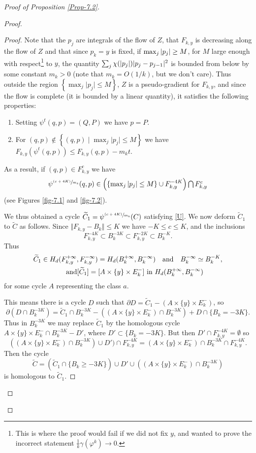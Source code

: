 \documentclass[JEP,XML,SOM,NoFloatCountersInSection,Unicode,published]{cedram}
\newcommand{\psfrac}[2]{\sfrac{(#1)}{#2}}
\newcommand{\quand}{\quad\text{and}\quad}
\numberwithin{equation}{section}
\let \a a
\let \A A
\theoremstyle{plain}
\theoremstyle{definition}
\theoremstyle{remark}
\begin{document}
\begin{proof}[Proof of Proposition \ref{Prop-7.2}]
\begin{proof}
\begin{proof}
Note that the $p_j$ are integrals of the flow of $Z$, that $F_{k,y}$ is decreasing along the flow of $Z$ and that since $p_k=y$ is fixed, if $\max_j \vert p_j \vert \geq\nobreak  M$, for $M$ large enough with respect\footnote{This is where the proof would fail if we did not fix $y$, and wanted to prove the incorrect statement $\frac{1}{k}\gamma(\varphi^k) \to 0$.} to $y$, the quantity $\sum_j \chi(\vert p_j \vert) \vert p_j-\nobreak p_{j-1} \vert^2$ is bounded from below by some constant $m_k>0$ (note that $m_k=O(1/k)$, but we don't care). Thus outside the region $\left\{ \max_j \vert p_j \vert \leq M \right\}$, $Z$ is a pseudo-gradient for $F_{k,y}$, and since the flow is complete (it is bounded by a linear quantity), it satisfies the following properties:
\begin{enumerate}
\item Setting $\psi^t(q,p)=(Q,P)$ we have $p=P$.
\item For $(q,p) \notin \left\{ (q,p) \mid \max_j \vert p_j \vert \leq M \right\}$ we have $F_{k,y}(\psi^t(q,p))\leq F_{k,y}(q,p)-m_kt$.
\end{enumerate}
As a result, if $(q,p)\in F_{k,y}^c$ we have
\[\textstyle
\psi^{ \psfrac{c+4K}{m_k} }(q,p)\in \left (\left\{ \max_j \vert p_j \vert \leq M \right\} \cup F_{k,y}^{-4K}\right) \bigcap F_{k,y}^c
\]
(see Figures \ref{fig-7.1} and \ref{fig-7.2}).

We thus obtained a cycle $\widetilde C_1=\psi^{ \psfrac{c+4K}{m_k} }(C)$ satisfying \eqref{U}. We now deform $\widetilde C_1$ to $\widetilde C$ as follows.
Since $\Vert F_{k,y}-B_k \Vert \leq K$ we have $-K\leq c \leq K$, and the inclusions
\[
F_{k,y}^{-4K}\subset B_k^{-3K}\subset F_{k,y}^{-2K}\subset B_k^{-K}.
\]
Thus
\begin{gather*}
\widetilde C_1 \in H_d(F_{k,y}^{+\infty},F_{k,y}^{-\infty})
= H_d(B_k^{+\infty},B_k^{-\infty})\quand B_k^{-\infty}\simeq B_k^{-K},\\
\tag*{and} [\widetilde C_1] =[\A \times\nobreak \{y\}\times\nobreak E_k^- ]\text{ in }H_d(B_k^{+\infty},B_k^{-\infty})
\end{gather*}
for some cycle $\A$ representing the class $\a$.

This means there is a cycle $D$ such that $\partial D= \widetilde C_1 - (\A \times \{y\}\times E_k^-)$, so
\[
\partial (D\cap B_k^{-3K})= \widetilde C_1 \cap B_k^{-3K} - \left ((\A \times \{y\}\times E_k^-)\cap B_k^{-3K}\right) + D\cap \{B_k=-3K\}.
\]
Thus in $B_k^{-3K}$ we may replace $\widetilde C_1$ by the homologous cycle $\A\times \{y\}\times E_k^-\cap B_k^{-3K} - D'$, where $D'\subset \{B_k=-3K\}$.
But then $D'\cap F_{k,y}^{-4K}=\emptyset$ so
\[
((\A\times \{y\}\times E_k^-)\cap B_k^{-3K}) \cup D')\cap F_{k,y}^{-4K}=(A\times \{y\}\times E_k^-)\cap B_k^{-3K} \cap F_{k,y}^{-4K}.
\]
Then the cycle
\[
\widetilde C=(\widetilde C_1\cap \{B_k\geq -3K\})\cup D' \cup ((\A\times \{y\}\times E_k^-)\cap B_k^{-3K})
\]
is homologous to $\widetilde C_1$.


\end{proof}
\end{proof}
\end{proof}
\end{document}
